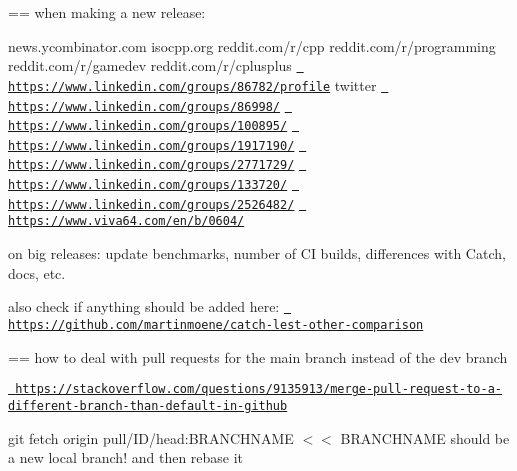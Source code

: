 == when making a new release\+:

news.\+ycombinator.\+com isocpp.\+org reddit.\+com/r/cpp reddit.\+com/r/programming reddit.\+com/r/gamedev reddit.\+com/r/cplusplus \href{https://www.linkedin.com/groups/86782/profile}{\texttt{ https\+://www.\+linkedin.\+com/groups/86782/profile}} twitter \href{https://www.linkedin.com/groups/86998/}{\texttt{ https\+://www.\+linkedin.\+com/groups/86998/}} \href{https://www.linkedin.com/groups/100895/}{\texttt{ https\+://www.\+linkedin.\+com/groups/100895/}} \href{https://www.linkedin.com/groups/1917190/}{\texttt{ https\+://www.\+linkedin.\+com/groups/1917190/}} \href{https://www.linkedin.com/groups/2771729/}{\texttt{ https\+://www.\+linkedin.\+com/groups/2771729/}} \href{https://www.linkedin.com/groups/133720/}{\texttt{ https\+://www.\+linkedin.\+com/groups/133720/}} \href{https://www.linkedin.com/groups/2526482/}{\texttt{ https\+://www.\+linkedin.\+com/groups/2526482/}} \href{https://www.viva64.com/en/b/0604/}{\texttt{ https\+://www.\+viva64.\+com/en/b/0604/}}

on big releases\+: update benchmarks, number of CI builds, differences with Catch, docs, etc.

also check if anything should be added here\+: \href{https://github.com/martinmoene/catch-lest-other-comparison}{\texttt{ https\+://github.\+com/martinmoene/catch-\/lest-\/other-\/comparison}}

== how to deal with pull requests for the main branch instead of the dev branch
\begin{DoxyItemize}
\item \href{https://stackoverflow.com/questions/9135913/merge-pull-request-to-a-different-branch-than-default-in-github}{\texttt{ https\+://stackoverflow.\+com/questions/9135913/merge-\/pull-\/request-\/to-\/a-\/different-\/branch-\/than-\/default-\/in-\/github}}
\item git fetch origin pull/\+ID/head\+:BRANCHNAME $<$$<$ BRANCHNAME should be a new local branch! and then rebase it
\end{DoxyItemize}

